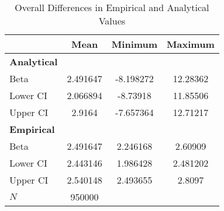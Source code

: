 \begin{table}[htbp]\centering
\def\sym#1{\ifmmode^{#1}\else\(^{#1}\)\fi}
\caption{Overall Differences in Empirical and Analytical Values}
\begin{tabular}{l*{1}{ccc}}
\hline\hline
            &        Mean&     Minimum&     Maximum\\
\hline
\textbf{Analytical}&            &            &            \\
Beta        &    2.491647&   -8.198272&    12.28362\\
Lower CI    &    2.066894&    -8.73918&    11.85506\\
Upper CI    &      2.9164&   -7.657364&    12.71217\\
\hline \textbf{Empirical}&            &            &            \\
Beta        &    2.491647&    2.246168&     2.60909\\
Lower CI    &    2.443146&    1.986428&    2.481202\\
Upper CI    &    2.540148&    2.493655&      2.8097\\
\hline
\(N\)       &      950000&            &            \\
\hline\hline
\end{tabular}
\end{table}
